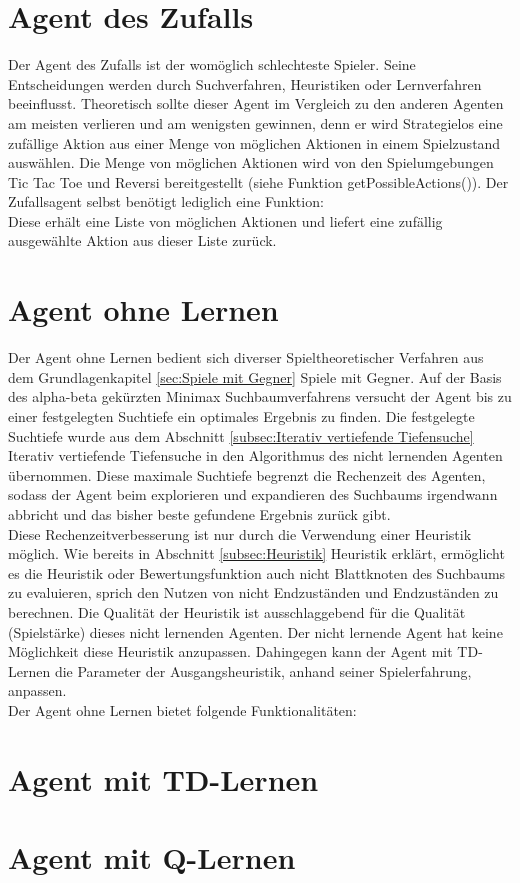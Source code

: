 \section{Agent des Zufalls}
Der Agent des Zufalls ist der womöglich schlechteste Spieler. Seine Entscheidungen werden durch Suchverfahren, Heuristiken oder Lernverfahren beeinflusst. Theoretisch sollte dieser Agent im Vergleich zu den anderen Agenten am meisten verlieren und am wenigsten gewinnen, denn er wird Strategielos eine zufällige Aktion aus einer Menge von möglichen Aktionen in einem Spielzustand auswählen. Die Menge von möglichen Aktionen wird von den Spielumgebungen Tic Tac Toe und Reversi bereitgestellt (siehe Funktion getPossibleActions()). Der Zufallsagent selbst benötigt lediglich eine Funktion:\\

Diese erhält eine Liste von möglichen Aktionen und liefert eine zufällig ausgewählte Aktion aus dieser Liste zurück.

\section{Agent ohne Lernen}
Der Agent ohne Lernen bedient sich diverser Spieltheoretischer Verfahren aus dem Grundlagenkapitel \ref{sec:Spiele mit Gegner} Spiele mit Gegner. Auf der Basis des alpha-beta gekürzten Minimax Suchbaumverfahrens versucht der Agent bis zu einer festgelegten Suchtiefe ein optimales Ergebnis zu finden. Die festgelegte Suchtiefe wurde aus dem Abschnitt \ref{subsec:Iterativ vertiefende Tiefensuche} Iterativ vertiefende Tiefensuche in den Algorithmus des nicht lernenden Agenten übernommen. Diese maximale Suchtiefe begrenzt die Rechenzeit des Agenten, sodass der Agent beim explorieren und expandieren des Suchbaums irgendwann abbricht und das bisher beste gefundene Ergebnis zurück gibt. \\

Diese Rechenzeitverbesserung ist nur durch die Verwendung einer Heuristik möglich. Wie bereits in Abschnitt \ref{subsec:Heuristik} Heuristik erklärt, ermöglicht es die Heuristik oder Bewertungsfunktion auch nicht Blattknoten des Suchbaums zu evaluieren, sprich den Nutzen von nicht Endzuständen und Endzuständen zu berechnen. Die Qualität der Heuristik ist ausschlaggebend für die Qualität (Spielstärke) dieses nicht lernenden Agenten. Der nicht lernende Agent hat keine Möglichkeit diese Heuristik anzupassen. Dahingegen kann der Agent mit TD-Lernen die Parameter der Ausgangsheuristik, anhand seiner Spielerfahrung, anpassen. \\

Der Agent ohne Lernen bietet folgende Funktionalitäten:\\



\section{Agent mit TD-Lernen}

\section{Agent mit Q-Lernen}


